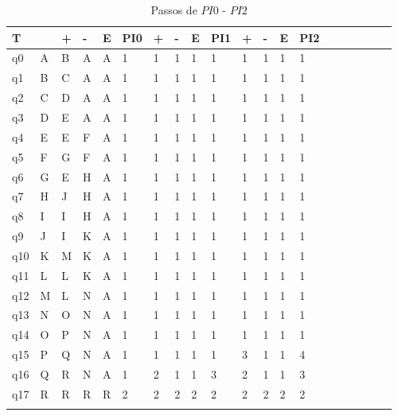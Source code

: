 \documentclass[12pt,a4paper]{report}
\begin{document}
\begin{table}[ht]
\caption{\label{tab:table-name} Passos de $PI0$ - $PI2$}
\centering
\begin{tabular}{ l l l l l l l l l l l l l l l l l l l l}
\hline
\hline
T      &   & + & - & E & PI0 & + & - & E & PI1 & + & - & E & PI2 &  &  &  &  &  &  \\ \hline
q0  & A & B & A & A & 1   & 1 & 1 & 1 & 1   & 1 & 1 & 1 & 1   &  &  &  &  &  &  \\
q1      & B & C & A & A & 1   & 1 & 1 & 1 & 1   & 1 & 1 & 1 & 1   &  &  &  &  &  &  \\
q2     & C & D & A & A & 1   & 1 & 1 & 1 & 1   & 1 & 1 & 1 & 1   &  &  &  &  &  &  \\
q3    & D & E & A & A & 1   & 1 & 1 & 1 & 1   & 1 & 1 & 1 & 1   &  &  &  &  &  &  \\
q4   & E & E & F & A & 1   & 1 & 1 & 1 & 1   & 1 & 1 & 1 & 1   &  &  &  &  &  &  \\
q5   & F & G & F & A & 1   & 1 & 1 & 1 & 1   & 1 & 1 & 1 & 1   &  &  &  &  &  &  \\
q6   & G & E & H & A & 1   & 1 & 1 & 1 & 1   & 1 & 1 & 1 & 1   &  &  &  &  &  &  \\
q7 & H & J & H & A & 1   & 1 & 1 & 1 & 1   & 1 & 1 & 1 & 1   &  &  &  &  &  &  \\
q8     & I & I & H & A & 1   & 1 & 1 & 1 & 1   & 1 & 1 & 1 & 1   &  &  &  &  &  &  \\
q9   & J & I & K & A & 1   & 1 & 1 & 1 & 1   & 1 & 1 & 1 & 1   &  &  &  &  &  &  \\
q10 & K & M & K & A & 1   & 1 & 1 & 1 & 1   & 1 & 1 & 1 & 1   &  &  &  &  &  &  \\
q11    & L & L & K & A & 1   & 1 & 1 & 1 & 1   & 1 & 1 & 1 & 1   &  &  &  &  &  &  \\
q12   & M & L & N & A & 1   & 1 & 1 & 1 & 1   & 1 & 1 & 1 & 1   &  &  &  &  &  &  \\
q13   & N & O & N & A & 1   & 1 & 1 & 1 & 1   & 1 & 1 & 1 & 1   &  &  &  &  &  &  \\
q14     & O & P & N & A & 1   & 1 & 1 & 1 & 1   & 1 & 1 & 1 & 1   &  &  &  &  &  &  \\
q15    & P & Q & N & A & 1   & 1 & 1 & 1 & 1   & 3 & 1 & 1 & 4   &  &  &  &  &  &  \\
q16   & Q & R & N & A & 1   & 2 & 1 & 1 & 3   & 2 & 1 & 1 & 3   &  &  &  &  &  &  \\
q17  & R & R & R & R & 2   & 2 & 2 & 2 & 2   & 2 & 2 & 2 & 2   &  &  &  &  &  &  \\
       &   &   &   &   &     &   &   &   &     &   &   &   &     &  &  &  &  &  &  \\
       \hline
\end{tabular}
\end{table}
\end{document}
